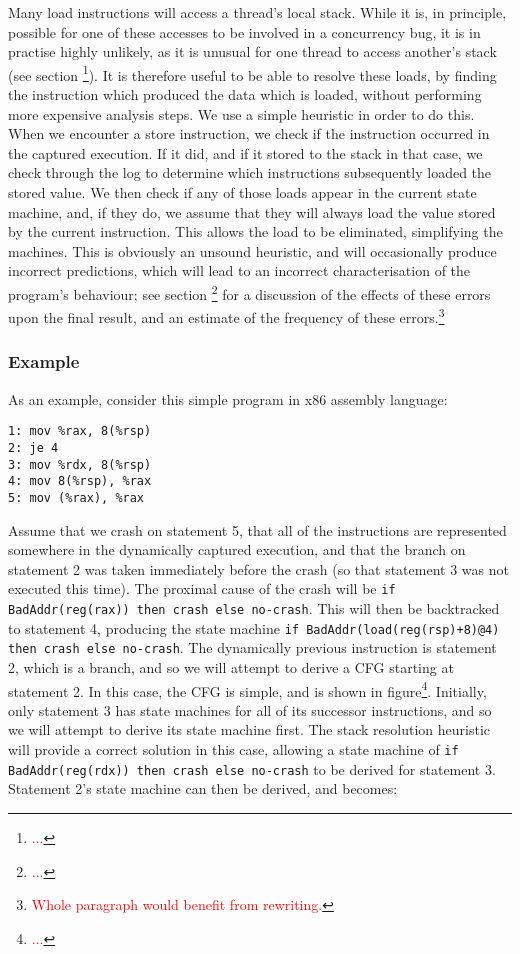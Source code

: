 \documentclass[10pt,twocolumn,preprint,natbib,authoryear]{sigplanconf}
\newcommand{\editorial}[1]{\textcolor{red}{\footnote{\textcolor{red}{#1}}}}
\begin{document}
Many load instructions will access a thread's local stack.  While it
is, in principle, possible for one of these accesses to be involved in
a concurrency bug, it is in practise highly unlikely, as it is unusual
for one thread to access another's stack (see section
\editorial{...}).  It is therefore useful to be able to resolve these
loads, by finding the instruction which produced the data which is
loaded, without performing more expensive analysis steps.  We use a
simple heuristic in order to do this.  When we encounter a store
instruction, we check if the instruction occurred in the captured
execution.  If it did, and if it stored to the stack in that case, we
check through the log to determine which instructions subsequently
loaded the stored value.  We then check if any of those loads appear
in the current state machine, and, if they do, we assume that they
will always load the value stored by the current instruction.  This
allows the load to be eliminated, simplifying the machines.  This is
obviously an unsound heuristic, and will occasionally produce
incorrect predictions, which will lead to an incorrect
characterisation of the program's behaviour; see section
\editorial{...}  for a discussion of the effects of these errors upon
the final result, and an estimate of the frequency of these
errors.\editorial{Whole paragraph would benefit from rewriting.}

\subsubsection{Example}

As an example, consider this simple program in x86 assembly language:

\begin{verbatim}
1: mov %rax, 8(%rsp)
2: je 4
3: mov %rdx, 8(%rsp)
4: mov 8(%rsp), %rax
5: mov (%rax), %rax
\end{verbatim}

Assume that we crash on statement 5, that all of the instructions are
represented somewhere in the dynamically captured execution, and that
the branch on statement 2 was taken immediately before the crash (so
that statement 3 was not executed this time).  The proximal cause of
the crash will be
\verb|if BadAddr(reg(rax)) then crash else no-crash|.  This will then
be backtracked to statement 4, producing the state machine
\verb|if BadAddr(load(reg(rsp)+8)@4) then crash else no-crash|.  The
dynamically previous instruction is statement 2, which is a branch,
and so we will attempt to derive a CFG starting at statement 2.  In
this case, the CFG is simple, and is shown in figure\editorial{...}.
Initially, only statement 3 has state machines for all of its
successor instructions, and so we will attempt to derive its state
machine first.  The stack resolution heuristic will provide a correct
solution in this case, allowing a state machine of
\verb|if BadAddr(reg(rdx)) then crash else no-crash| to be derived for
statement 3.  Statement 2's state machine can then be derived, and
becomes:
\end{document}
